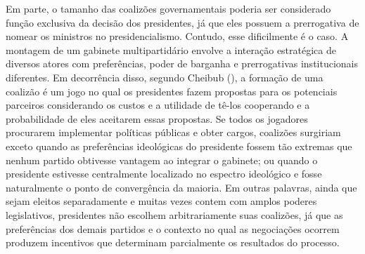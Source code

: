 Em parte, o tamanho das coalizões governamentais poderia ser considerado função exclusiva da decisão dos presidentes, já que eles possuem a prerrogativa de nomear os ministros no presidencialismo. Contudo, esse dificilmente é o caso. A montagem de um gabinete multipartidário envolve a interação estratégica de diversos atores com preferências, poder de barganha e prerrogativas institucionais diferentes. Em decorrência disso, segundo Cheibub (\citeyear{cheibub2007}), a formação de uma coalizão é um jogo no qual os presidentes fazem propostas para os potenciais parceiros considerando os custos e a utilidade de tê-los cooperando e a probabilidade de eles aceitarem essas propostas. Se todos os jogadores procurarem implementar políticas públicas e obter cargos, coalizões surgiriam exceto quando as preferências ideológicas do presidente fossem tão extremas que nenhum partido obtivesse vantagem ao integrar o gabinete; ou quando o presidente estivesse centralmente localizado no espectro ideológico e fosse naturalmente o ponto de convergência da maioria. Em outras palavras, ainda que sejam eleitos separadamente e muitas vezes contem com amplos poderes legislativos, presidentes não escolhem arbitrariamente suas coalizões, já que as preferências dos demais partidos e o contexto no qual as negociações ocorrem produzem incentivos que determinam parcialmente os resultados do processo.

